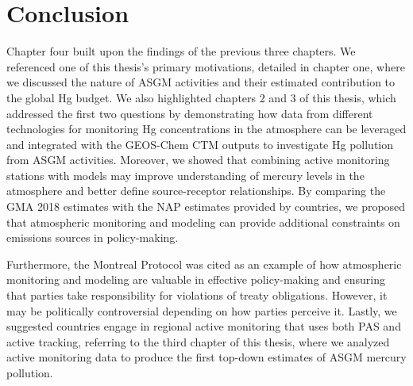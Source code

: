 \section{Conclusion}
\begin{flushleft}

Chapter four built upon the findings of the previous three chapters. We referenced one of this thesis's primary motivations, detailed in chapter one, where we discussed the nature of ASGM activities and their estimated contribution to the global Hg budget. We also highlighted chapters 2 and 3 of this thesis, which addressed the first two questions by demonstrating how data from different technologies for monitoring Hg concentrations in the atmosphere can be leveraged and integrated with the GEOS-Chem CTM outputs to investigate Hg pollution from ASGM activities. Moreover, we showed that combining active monitoring stations with models may improve understanding of mercury levels in the atmosphere and better define source-receptor relationships. By comparing the GMA 2018 estimates with the NAP estimates provided by countries, we proposed that atmospheric monitoring and modeling can provide additional constraints on emissions sources in policy-making.
\end{flushleft}
\begin{flushleft}
Furthermore, the Montreal Protocol was cited as an example of how atmospheric monitoring and modeling are valuable in effective policy-making and ensuring that parties take responsibility for violations of treaty obligations. However, it may be politically controversial depending on how parties perceive it. Lastly, we suggested countries engage in regional active monitoring that uses both PAS and active tracking, referring to the third chapter of this thesis, where we analyzed active monitoring data to produce the first top-down estimates of ASGM mercury pollution.  
\end{flushleft}